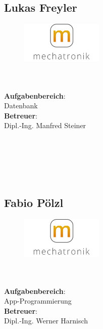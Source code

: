 \subsection*{Lukas Freyler}
\begin{figure}
\begin{center}
  \includegraphics[width=0.35\textwidth]{logoMecha}
\end{center}
\end{figure}
\mbox{}\\
\mbox{}\\
\textbf{Aufgabenbereich}:\\
Datenbank\\
\textbf{Betreuer}:\\
Dipl.-Ing. Manfred Steiner
\mbox{}\\
\mbox{}\\
\mbox{}\\
\mbox{}\\
\mbox{}\\
\mbox{}\\

\subsection*{Fabio Pölzl}
\begin{figure}
\begin{center}
  \includegraphics[width=0.35\textwidth]{LogoMecha}
\end{center}
\end{figure}
\mbox{}\\
\mbox{}\\
\textbf{Aufgabenbereich}:\\
App-Programmierung\\
\textbf{Betreuer}:\\
Dipl.-Ing. Werner Harnisch
\mbox{}\\
\mbox{}\\
\mbox{}\\
\mbox{}\\
\mbox{}\\
\newpage